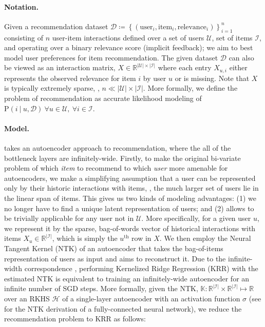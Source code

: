 \documentclass{article}
\begin{document}
\paragraph{Notation.} Given a recommendation dataset $\mathcal{D} \coloneqq \left\{ (\text{user}_i, \text{item}_i, \text{relevance}_i) \right\}_{i=1}^{n}$ consisting of $n$ user-item interactions defined over a set of users $\mathcal{U}$, set of items $\mathcal{I}$, and operating over a binary relevance score (implicit feedback); we aim to best model user preferences for item recommendation. The given dataset $\mathcal{D}$ can also be viewed as an interaction matrix, $X \in \mathbb{R}^{|\mathcal{U}| \times |\mathcal{I}|}$ where each entry $X_{u, i}$ either represents the observed relevance for item $i$ by user $u$ or is missing. Note that $X$ is typically extremely sparse, \ie, $n \ll |\mathcal{U}| \times |\mathcal{I}|$. More formally, we define the problem of recommendation as accurate likelihood modeling of $\text{P}(i ~|~ u, \mathcal{D}) ~ \forall u \in \mathcal{U}, ~ \forall i \in \mathcal{I}$.

\paragraph{Model.} \model takes an autoencoder approach to recommendation, where the all of the bottleneck layers are infinitely-wide. Firstly, to make the original bi-variate problem of which \emph{item} to recommend to which \emph{user} more amenable for autoencoders, we make a simplifying assumption that a user can be represented only by their historic interactions with items, \ie, the much larger set of users lie in the linear span of items. This gives us two kinds of modeling advantages: (1) we no longer have to find a unique latent representation of users; and (2) allows \model to be trivially applicable for any user not in $\mathcal{U}$. More specifically, for a given user $u$, we represent it by the sparse, bag-of-words vector of historical interactions with items $X_u \in \mathbb{R}^{|\mathcal{I}|}$, which is simply the $u^{\text{th}}$ row in $X$. We then employ the Neural Tangent Kernel (NTK) \cite{ntk} of an autoencoder that takes the bag-of-items representation of users as input and aims to reconstruct it. Due to the infinite-width correspondence \cite{ntk, finite_vs_infinite_3}, performing Kernelized Ridge Regression (KRR) with the estimated NTK is equivalent to training an infinitely-wide autoencoder for an infinite number of SGD steps.
More formally, given the NTK, $\mathbb{K} : \mathbb{R}^{|\mathcal{I}|} \times \mathbb{R}^{|\mathcal{I}|} \mapsto \mathbb{R}$ over an RKHS $\mathcal{H}$ of a single-layer autoencoder with an activation function $\sigma$ (see \cite{ntk_class_notes} for the NTK derivation of a fully-connected neural network), we reduce the recommendation problem to KRR as follows:
\end{document}
